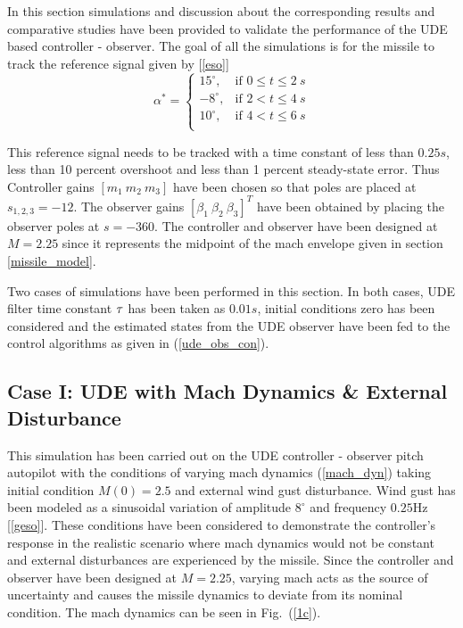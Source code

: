 \documentclass[conference]{IEEEtran}
\begin{document}
	In this section simulations and discussion about the corresponding results and comparative studies have been provided to validate the performance of the UDE based controller - observer. The goal of all the simulations is for the missile to track the reference signal given by [\ref{eso}]
	\begin{equation}
		\alpha^{*}=
		\begin{cases}
			15^{\circ}, & \text{if $0 \leq t \leq2 ~ s$}\\
			-8^{\circ}, & \text{if $2 < t \leq4 ~ s$}\\
			10^{\circ}, & \text{if $4 < t \leq6 ~ s$} \label{ref_sig}\\ 
		\end{cases}
	\end{equation}
	
	This reference signal needs to be tracked with a time constant of less than $0.25s$, less than 10 percent overshoot and less than 1 percent steady-state error. Thus Controller gains $[m_1\ m_2 \ m_3]$ have been chosen so that poles are placed at $s_{1,2,3} = -12$. The observer gains $[\beta_1 \ \beta_2 \ \beta_3]^T$ have been obtained by placing the observer poles at $s = -360$. The controller and observer have been designed at $M = 2.25$ since it represents the midpoint of the mach envelope given in section \ref{missile_model}.
	
	Two cases of simulations have been performed in this section. In both cases, UDE filter time constant $\mathlarger{\tau}$ has been taken as $0.01s$, initial conditions zero has been considered and the estimated states from the UDE observer have been fed to the control algorithms as given in (\ref{ude_obs_con}). 
	
	\subsection*{Case I: UDE with Mach Dynamics \& External Disturbance}
	
		This simulation has been carried out on the UDE controller - observer pitch autopilot with the conditions of varying mach dynamics (\ref{mach_dyn}) taking initial condition $M(0) = 2.5$ and external wind gust disturbance. Wind gust has been modeled as a sinusoidal variation of amplitude $8^\circ$ and frequency $0.25$Hz [\ref{geso}]. These conditions have been considered to demonstrate the controller's response in the realistic scenario where mach dynamics would not be constant and external disturbances are experienced by the missile. Since the controller and observer have been designed at $M = 2.25$, varying mach acts as the source of uncertainty and causes the missile dynamics to deviate from its nominal condition. The mach dynamics can be seen in Fig.~(\ref{1c}).
		
\end{document}
